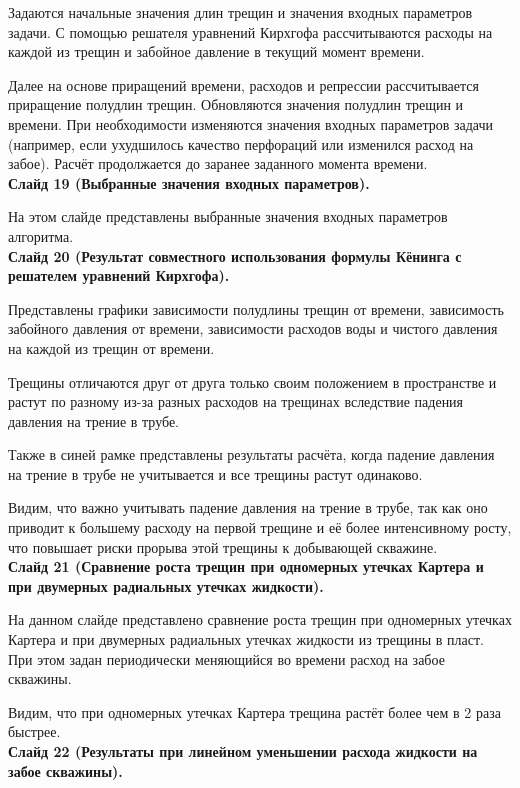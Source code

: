 \documentclass[a4paper, 12pt]{article}
\begin{document}
Задаются начальные значения длин трещин и значения входных параметров задачи.
С помощью решателя уравнений Кирхгофа рассчитываются расходы на каждой из трещин и забойное давление в текущий момент времени.

Далее на основе приращений времени, расходов и репрессии рассчитывается приращение полудлин трещин.
Обновляются значения полудлин трещин и времени.
При необходимости изменяются значения входных параметров задачи (например, если ухудшилось качество перфораций или изменился расход на забое).
Расчёт продолжается до заранее заданного момента времени.
\\

\textbf{Слайд 19 (Выбранные значения входных параметров).}

На этом слайде представлены выбранные значения входных параметров алгоритма.
\\

\textbf{Слайд 20 (Результат совместного использования формулы Кёнинга с решателем уравнений Кирхгофа).}

Представлены графики зависимости полудлины трещин от времени, зависимость забойного давления от времени, зависимости расходов воды и чистого давления на каждой из трещин от времени.

Трещины отличаются друг от друга только своим положением в пространстве и растут по разному из-за разных расходов на трещинах вследствие падения давления на трение в трубе.

Также в синей рамке представлены результаты расчёта, когда падение давления на трение в трубе не учитывается и все трещины растут одинаково.

Видим, что важно учитывать падение давления на трение в трубе, так как оно приводит к большему расходу на первой трещине и её более интенсивному росту, что повышает риски прорыва этой трещины к добывающей скважине.
\\

\textbf{Слайд 21 (Сравнение роста трещин при одномерных утечках Картера и при двумерных радиальных утечках жидкости).}

На данном слайде представлено сравнение роста трещин при одномерных утечках Картера и при двумерных радиальных утечках жидкости из трещины в пласт.
При этом задан периодически меняющийся во времени расход на забое скважины.

Видим, что при одномерных утечках Картера трещина растёт более чем в 2 раза быстрее.
\\

\textbf{Слайд 22 (Результаты при линейном уменьшении расхода жидкости на забое скважины).}
\end{document}
